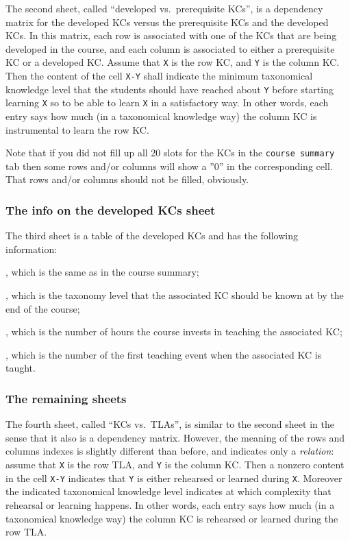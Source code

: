 The second sheet, called ``developed vs.\ prerequisite KCs'', is a dependency matrix for the developed \acp{KC} versus the prerequisite \acp{KC} and the developed \acp{KC}. In this matrix, each row is associated with one of the \acp{KC} that are being developed in the course, and each column is associated to either a prerequisite \ac{KC} or a developed \ac{KC}. Assume that \texttt{X} is the row \ac{KC}, and \texttt{Y} is the column \ac{KC}. Then the content of the cell \texttt{X-Y} shall indicate the minimum taxonomical knowledge level that the students should have reached about \texttt{Y} before starting learning \texttt{X} so to be able to learn \texttt{X} in a satisfactory way. In other words, each entry says how much (in a taxonomical knowledge way) the column \ac{KC} is instrumental to learn the row \ac{KC}.

Note that if you did not fill up all 20 slots for the \acp{KC} in the \texttt{course summary} tab then some rows and/or columns will show a ''0'' in the corresponding cell. That rows and/or columns should not be filled, obviously.


\subsubsection{The info on the developed KCs sheet}

The third sheet is a table of the developed \acp{KC} and has the following information:

\begin{itemize}

	, which is the same as in the course summary;
	
	, which is the taxonomy level that the associated \ac{KC} should be known at by the end of the course;
	
	, which is the number of hours the course invests in teaching the associated \ac{KC};
	
	, which is the number of the first teaching event when the associated \ac{KC} is taught.

\end{itemize}


\subsubsection{The remaining sheets}

The fourth sheet, called ``KCs vs.\ TLAs'', is similar to the second sheet in the sense that it also is a dependency matrix. However, the meaning of the rows and columns indexes is slightly different than before, and indicates only a \emph{relation}: assume that \texttt{X} is the row \ac{TLA}, and \texttt{Y} is the column \ac{KC}. Then a nonzero content in the cell \texttt{X-Y} indicates that \texttt{Y} is either rehearsed or learned during \texttt{X}. Moreover the indicated taxonomical knowledge level indicates at which complexity that rehearsal or learning happens. In other words, each entry says how much (in a taxonomical knowledge way) the column \ac{KC} is rehearsed or learned during the row \ac{TLA}.

